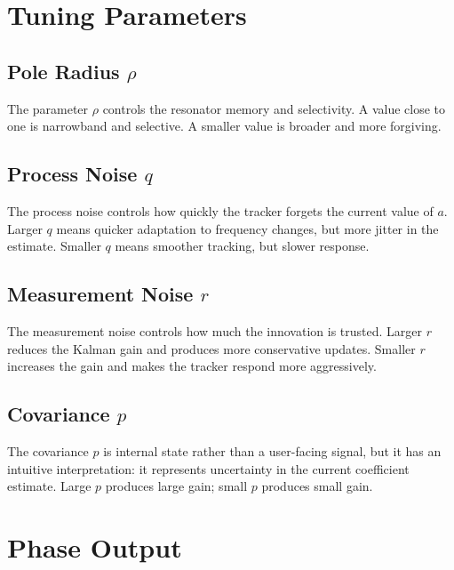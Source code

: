 \documentclass[conference]{IEEEtran}
\begin{document}
    \section{Tuning Parameters}\label{sec:tuning}

    \subsection{Pole Radius $\rho$}

    The parameter $\rho$ controls the resonator memory and selectivity.
    A value close to one is narrowband and selective. A smaller value is broader
    and more forgiving.

    \subsection{Process Noise $q$}

    The process noise controls how quickly the tracker forgets the current value
    of $a$. Larger $q$ means quicker adaptation to frequency changes, but more
    jitter in the estimate. Smaller $q$ means smoother tracking, but slower
    response.

    \subsection{Measurement Noise $r$}

    The measurement noise controls how much the innovation is trusted.
    Larger $r$ reduces the Kalman gain and produces more conservative updates.
    Smaller $r$ increases the gain and makes the tracker respond more aggressively.

    \subsection{Covariance $p$}

    The covariance $p$ is internal state rather than a user-facing signal, but it
    has an intuitive interpretation: it represents uncertainty in the current
    coefficient estimate. Large $p$ produces large gain; small $p$ produces small
    gain.

    \section{Phase Output}\label{sec:phase}
\end{document}
